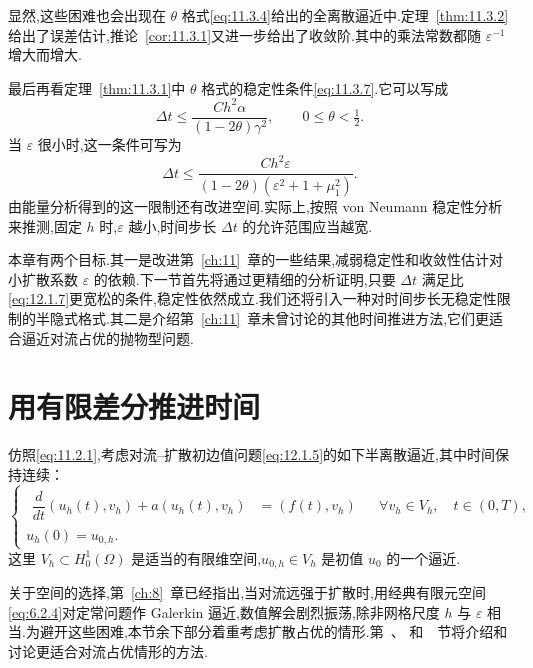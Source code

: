 显然,这些困难也会出现在 \(\theta\) 格式\eqref{eq:11.3.4}给出的全离散逼近中.定理~\ref{thm:11.3.2}给出了误差估计,推论~\ref{cor:11.3.1}又进一步给出了收敛阶.其中的乘法常数都随 \(\varepsilon^{-1}\) 增大而增大.

最后再看定理~\ref{thm:11.3.1}中 \(\theta\) 格式的稳定性条件\eqref{eq:11.3.7}.它可以写成
\[
  \Delta t\le\frac{Ch^2\alpha}{(1-2\theta)\gamma^2},
  \qquad 0\le\theta<\tfrac12.
\]
当 \(\varepsilon\) 很小时,这一条件可写为
\begin{equation}\label{eq:12.1.7}
  \Delta t\le\frac{Ch^2\varepsilon}
    {(1-2\theta)(\varepsilon^2+1+\mu_1^2)}.
\end{equation}
由能量分析得到的这一限制还有改进空间.实际上,按照 von Neumann 稳定性分析来推测,固定 \(h\) 时,\(\varepsilon\) 越小,时间步长 \(\Delta t\) 的允许范围应当越宽.

本章有两个目标.其一是改进第~\ref{ch:11}~章的一些结果,减弱稳定性和收敛性估计对小扩散系数 \(\varepsilon\) 的依赖.下一节首先将通过更精细的分析证明,只要 \(\Delta t\) 满足比\eqref{eq:12.1.7}更宽松的条件,稳定性依然成立.我们还将引入一种对时间步长无稳定性限制的半隐式格式.其二是介绍第~\ref{ch:11}~章未曾讨论的其他时间推进方法,它们更适合逼近对流占优的抛物型问题.

\section{用有限差分推进时间}\label{sec:12.2}

仿照\eqref{eq:11.2.1},考虑对流--扩散初边值问题\eqref{eq:12.1.5}的如下半离散逼近,其中时间保持连续：
\begin{equation}\label{eq:12.2.1}
  \begin{cases}
    \begin{aligned}
      \dfrac{d}{dt}(u_h(t),v_h)+a(u_h(t),v_h)
        &=(f(t),v_h) &&\forall v_h\in V_h,\quad t\in(0,T),
    \end{aligned}\\[2pt]
    u_h(0)=u_{0,h}.
  \end{cases}
\end{equation}
这里 \(V_h\subset H_0^1(\Omega)\) 是适当的有限维空间,\(u_{0,h}\in V_h\) 是初值 \(u_0\) 的一个逼近.

关于空间的选择,第~\ref{ch:8}~章已经指出,当对流远强于扩散时,用经典有限元空间\eqref{eq:6.2.4}对定常问题作 Galerkin 逼近,数值解会剧烈振荡,除非网格尺度 \(h\) 与 \(\varepsilon\) 相当.为避开这些困难,本节余下部分着重考虑扩散占优的情形.第~、 和~~节将介绍和讨论更适合对流占优情形的方法.

